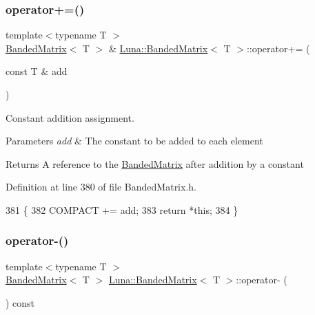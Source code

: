 \subsubsection{\texorpdfstring{operator+=()}{operator+=()}\hspace{0.1cm}{\footnotesize\ttfamily [2/2]}}
{\footnotesize\ttfamily template$<$typename T $>$ \\
\hyperlink{classLuna_1_1BandedMatrix}{Banded\+Matrix}$<$ T $>$ \& \hyperlink{classLuna_1_1BandedMatrix}{Luna\+::\+Banded\+Matrix}$<$ T $>$\+::operator+= (\begin{DoxyParamCaption}\item[{const T \&}]{add }\end{DoxyParamCaption})\hspace{0.3cm}{\ttfamily [inline]}}



Constant addition assignment. 


\begin{DoxyParams}{Parameters}
{\em add} & The constant to be added to each element \\
\hline
\end{DoxyParams}
\begin{DoxyReturn}{Returns}
A reference to the \hyperlink{classLuna_1_1BandedMatrix}{Banded\+Matrix} after addition by a constant 
\end{DoxyReturn}


Definition at line 380 of file Banded\+Matrix.\+h.


\begin{DoxyCode}
381   \{
382     COMPACT += add;
383     \textcolor{keywordflow}{return} *\textcolor{keyword}{this};
384   \}
\end{DoxyCode}
\mbox{\label{classLuna_1_1BandedMatrix_af4e0c5aeedec88bc7704243c1d965922}} 
\subsubsection{\texorpdfstring{operator-\/()}{operator-()}\hspace{0.1cm}{\footnotesize\ttfamily [1/2]}}
{\footnotesize\ttfamily template$<$typename T $>$ \\
\hyperlink{classLuna_1_1BandedMatrix}{Banded\+Matrix}$<$ T $>$ \hyperlink{classLuna_1_1BandedMatrix}{Luna\+::\+Banded\+Matrix}$<$ T $>$\+::operator-\/ (\begin{DoxyParamCaption}{ }\end{DoxyParamCaption}) const\hspace{0.3cm}{\ttfamily [inline]}}




